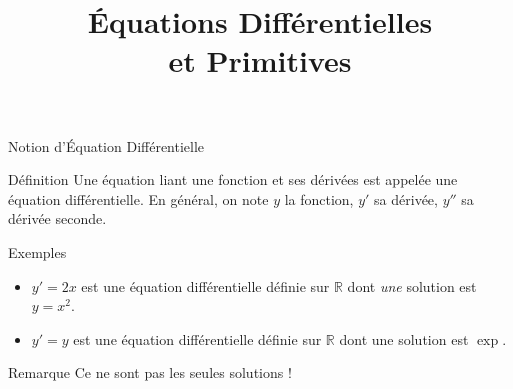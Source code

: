 \documentclass{cours}
\title{Équations Différentielles \\ et Primitives}
\begin{document}

    \begin{Gpartie}{Notion d'Équation Différentielle} 
        \begin{Spartie}{Définition} 
            Une équation liant une fonction et ses dérivées est appelée une équation différentielle. En général, on note $y$ la fonction, $y'$ sa dérivée, $y''$ sa dérivée seconde.
        \end{Spartie}
        \begin{Spartie}{Exemples} 
            \begin{itemize}
                \item $y'=2x$ est une équation différentielle définie sur $\mathbb{R}$ dont \textit{une} solution est $y=x^2$.
                \item $y'=y$ est une équation différentielle définie sur $\mathbb{R}$ dont une solution est $\exp$.
            \end{itemize}
            \begin{SSpartie}{Remarque} 
                Ce ne sont pas les seules solutions !
            \end{SSpartie}
        \end{Spartie}
    \end{Gpartie}
\end{document}
